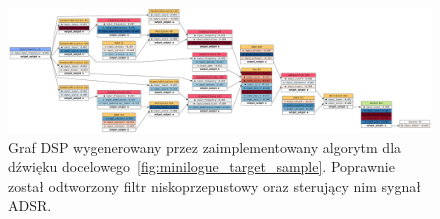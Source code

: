 \begin{figure}
    \centering
    \includegraphics[angle=90,width=0.44\linewidth]{rys06/evolved_graph_minilogue.png}
    \caption{
      Graf DSP wygenerowany przez zaimplementowany algorytm
      dla dźwięku docelowego~\ref{fig:minilogue_target_sample}.
      Poprawnie został odtworzony filtr niskoprzepustowy oraz
      sterujący nim sygnał ADSR\@.
    }\label{fig:evolved_graph_op1}
\end{figure}

